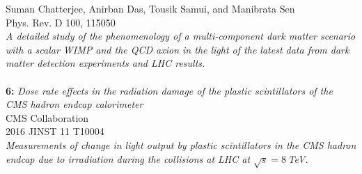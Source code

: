 \documentclass[a4paper,11pt]{article}
\begin{document}
Suman Chatterjee, Anirban Das, Tousik Samui, and Manibrata Sen\\
Phys. Rev. D 100, 115050\\
\textit{A detailed study of the phenomenology of a multi-component dark matter scenario with
a scalar WIMP and the QCD axion in the light of the latest data from dark matter detection experiments and
LHC results.}\\
\\
\textbf{6:} \textit{Dose rate effects in the radiation damage of the plastic scintillators of the CMS hadron endcap calorimeter}\\
CMS Collaboration \\
2016 JINST 11 T10004\\
\textit{Measurements of change in light output by plastic scintillators in the CMS hadron endcap due to irradiation during the collisions at LHC at $\sqrt{s} = 8$\,TeV.}\\


\end{document}
